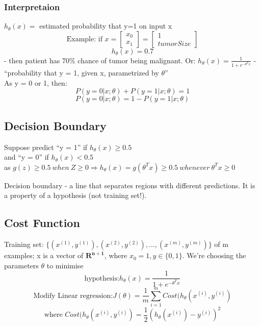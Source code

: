\documentclass{scrartcl}
\begin{document}
\subsubsection{Interpretaion}
$h_\theta(x) = $ estimated probability that y=1 on input x
\begin{equation*}
  \textrm{Example: if }  x = \left[ \begin{array}{c} x_0 \\
      x_1  \end{array} \right] = \left[ \begin{array}{c} 1 \\
      tumorSize  \end{array} \right]
\end{equation*}
\begin{equation*} h_\theta(x) = 0.7 \end{equation*} - then patient has
70\% chance of tumor being malignant. Or: $ h_\theta(x) = \frac{1}{1 +
  e^{-\theta^Tx}}$ - ``probability that y = 1, given
x, parametrized by $\theta$'' \\
As y = 0 or 1, then:
\[P( y = 0 | x;\theta) + P(y=1|x;\theta) = 1\]
\[P( y = 0 | x;\theta) = 1 - P(y=1|x;\theta)\]

\subsection{Decision Boundary}
Suppose predict ``y = 1'' if $h_\theta(x) \geq 0.5$ \\
and ``y = 0'' if $h_\theta(x) < 0.5$ \\

as $g(z) \geq 0.5 \ when \ Z \geq 0 \Rightarrow h_\theta(x) =
g(\theta^Tx) \geq 0.5 \ whenever \ \theta^Tx \geq 0$
\label {page 10 from pdf}

Decision boundary - a line that separates regions with different
predictions. It is a property of a hypothesis (not training set!).

\subsection{Cost Function}
\label{sec:6-4}
Training set: $\{(x^{(1)},y^{(1)}), (x^{(2)},y^{(2)}), \dots ,
(x^{(m)},y^{(m)})\}$ of m examples; x is a vector of
$\mathbf{R^{n+1}}$, where $x_0 = 1, y \in \{0, 1\}$. We're choosing
the parameters $\theta$ to minimise
\[ \textrm{hypothesis:} h_\theta(x) = \frac{1}{1 + e^{-\theta^T x}} \]
\[ \textrm{Modify Linear regression:} J(\theta) = \frac{1}{m}
\sum\limits_{i=1}^m Cost (h_\theta(x^{(i)}, y^{(i)}) \]
\[ \textrm{where } Cost (h_\theta(x^{(i)}, y^{(i)}) =
\frac{1}{2}(h_\theta(x^{(i)}) - y^{(i)})^2 \]
\end{document}
